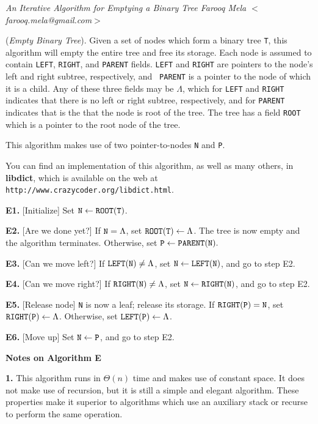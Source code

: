 \nopagenumbers
\parskip=2pt
\parindent=0pt

{\sl An Iterative Algorithm for Emptying a Binary Tree
	\hfill \rm Farooq Mela $<$farooq.mela@gmail.com$>$}

\medskip

 ({\it Empty Binary Tree}).
Given a set of nodes which form a binary tree {\tt T}, this algorithm will
empty the entire tree and free its storage. Each node is assumed to contain
{\tt LEFT}, {\tt RIGHT}, and {\tt PARENT} fields. {\tt LEFT} and {\tt RIGHT}
are pointers to the node's left and right subtree, respectively, and {\tt
PARENT} is a pointer to the node of which it is a child. Any of these three
fields may be $\Lambda$, which for {\tt LEFT} and {\tt RIGHT} indicates that
there is no left or right subtree, respectively, and for {\tt PARENT} indicates
that is the that the node is root of the tree. The tree has a field {\tt ROOT}
which is a pointer to the root node of the tree.

This algorithm makes use of two pointer-to-nodes {\tt N} and {\tt P}.

\medskip
You can find an implementation of this algorithm, as well as many others, in
{\bf libdict}, which is available on the web at
{\tt http://www.crazycoder.org/libdict.html}.
\medskip
\parindent=36pt

\item{\bf E1.} [Initialize]
Set ${\tt N} \gets {\tt ROOT(T)}$.

\item{\bf E2.} [Are we done yet?]
If ${\tt N} = \Lambda$, set ${\tt ROOT(T)} \gets \Lambda$.
The tree is now empty and the algorithm terminates.
Otherwise, set ${\tt P} \gets {\tt PARENT(N)}.$

\item{\bf E3.} [Can we move left?]
If ${\tt LEFT(N)} \neq \Lambda$, set ${\tt N} \gets {\tt LEFT(N)}$, and
go to step E2.

\item{\bf E4.} [Can we move right?]
If ${\tt RIGHT(N)} \neq \Lambda$, set ${\tt N} \gets {\tt RIGHT(N)}$, and
go to step E2.

\item{\bf E5.} [Release node]
{\tt N} is now a leaf; release its storage.
If ${\tt RIGHT(P)} = {\tt N}$, set ${\tt RIGHT(P)} \gets \Lambda$.
Otherwise, set ${\tt LEFT(P)} \gets \Lambda$.

\item{\bf E6.} [Move up]
Set ${\tt N} \gets {\tt P}$, and go to step E2.

\medskip
\parindent=0pt
{\bf Notes on Algorithm E}
\parindent=36pt
\item{\bf 1.} This algorithm runs in $\Theta(n)$ time and makes use of constant
space. It does not make use of recursion, but it is still a simple and elegant
algorithm. These properties make it superior to algorithms which use an
auxiliary stack or recurse to perform the same operation.

\parindent=0pt
\medskip

\bye
